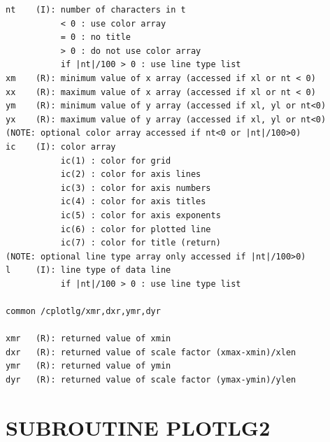 \documentclass[11pt]{report}
\begin{document}
\begin{verbatim}
nt    (I): number of characters in t
           < 0 : use color array
           = 0 : no title
           > 0 : do not use color array
           if |nt|/100 > 0 : use line type list
xm    (R): minimum value of x array (accessed if xl or nt < 0)
xx    (R): maximum value of x array (accessed if xl or nt < 0)
ym    (R): minimum value of y array (accessed if xl, yl or nt<0)
yx    (R): maximum value of y array (accessed if xl, yl or nt<0)
(NOTE: optional color array accessed if nt<0 or |nt|/100>0)
ic    (I): color array
           ic(1) : color for grid
           ic(2) : color for axis lines
           ic(3) : color for axis numbers
           ic(4) : color for axis titles
           ic(5) : color for axis exponents
           ic(6) : color for plotted line
           ic(7) : color for title (return)
(NOTE: optional line type array only accessed if |nt|/100>0)
l     (I): line type of data line
           if |nt|/100 > 0 : use line type list

common /cplotlg/xmr,dxr,ymr,dyr

xmr   (R): returned value of xmin
dxr   (R): returned value of scale factor (xmax-xmin)/xlen
ymr   (R): returned value of ymin
dyr   (R): returned value of scale factor (ymax-ymin)/ylen
\end{verbatim}

\newpage
\section{SUBROUTINE PLOTLG2}
\end{document}
